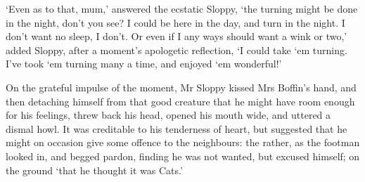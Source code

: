 ‘Even as to that, mum,’ answered the ecstatic Sloppy, ‘the turning might
be done in the night, don’t you see? I could be here in the day, and
turn in the night. I don’t want no sleep, I don’t. Or even if I any ways
should want a wink or two,’ added Sloppy, after a moment’s apologetic
reflection, ‘I could take ‘em turning. I’ve took ‘em turning many a
time, and enjoyed ‘em wonderful!’

On the grateful impulse of the moment, Mr Sloppy kissed Mrs Boffin’s
hand, and then detaching himself from that good creature that he might
have room enough for his feelings, threw back his head, opened his mouth
wide, and uttered a dismal howl. It was creditable to his tenderness of
heart, but suggested that he might on occasion give some offence to the
neighbours: the rather, as the footman looked in, and begged pardon,
finding he was not wanted, but excused himself; on the ground ‘that he
thought it was Cats.’



